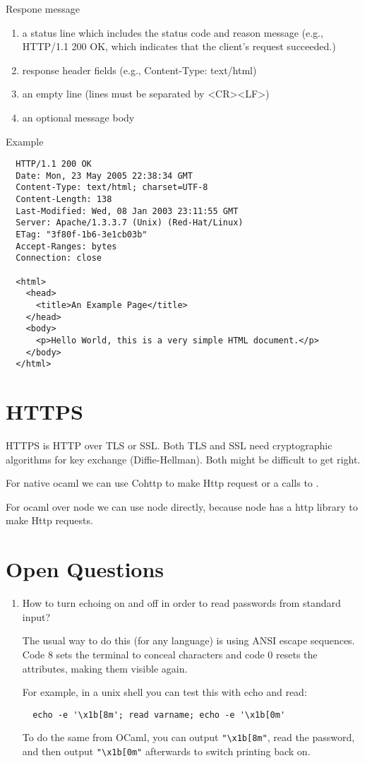 \noindent Respone message
\begin{enumerate}
\item a status line which includes the status code and reason message (e.g.,
  HTTP/1.1 200 OK, which indicates that the client's request succeeded.)

\item response header fields (e.g., Content-Type: text/html)

\item an empty line (lines must be separated by <CR><LF>)

\item an optional message body
\end{enumerate}
%
Example
{\small
\begin{verbatim}
  HTTP/1.1 200 OK
  Date: Mon, 23 May 2005 22:38:34 GMT
  Content-Type: text/html; charset=UTF-8
  Content-Length: 138
  Last-Modified: Wed, 08 Jan 2003 23:11:55 GMT
  Server: Apache/1.3.3.7 (Unix) (Red-Hat/Linux)
  ETag: "3f80f-1b6-3e1cb03b"
  Accept-Ranges: bytes
  Connection: close

  <html>
    <head>
      <title>An Example Page</title>
    </head>
    <body>
      <p>Hello World, this is a very simple HTML document.</p>
    </body>
  </html>
  \end{verbatim}
}


\section{HTTPS}

HTTPS is HTTP over TLS or SSL. Both TLS and SSL need cryptographic algorithms
for key exchange (Diffie-Hellman). Both might be difficult to get right.

For native ocaml we can use Cohttp to make Http request or a calls to
.

For ocaml over node we can use node directly, because node has a http library
to make Http requests.


\section{Open Questions}

\begin{enumerate}
\item How to turn echoing on and off in order to read passwords from standard
  input?

  The usual way to do this (for any language) is using ANSI escape
  sequences. Code 8 sets the terminal to conceal characters and code 0 resets
  the attributes, making them visible again.

  For example, in a unix shell you can test this with echo and read:
  \begin{verbatim}
  echo -e '\x1b[8m'; read varname; echo -e '\x1b[0m'
  \end{verbatim}
  To do the same from OCaml, you can output \verb|"\x1b[8m"|, read the
  password, and then output \verb|"\x1b[0m"| afterwards to switch printing
  back on.

\end{enumerate}
